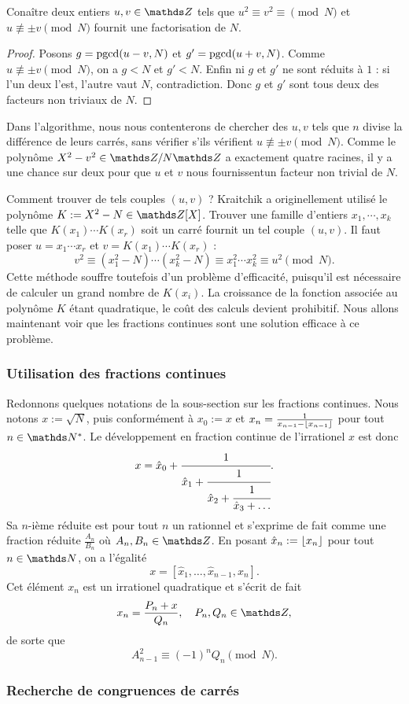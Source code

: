 \begin{lemme}
	Conaître deux entiers $u, v \in \Z$ tels que $u^2 \equiv v^2 \equiv
	\pmod{N}$ et $u\not\equiv \pm v\pmod{N}$ fournit une factorisation de $N$.
\end{lemme}

\begin{proof}
	Posons $g =\operatorname{pgcd}(u-v, N)$ et $g' = \operatorname{pgcd}(u+v, N)$. Comme $u\not\equiv \pm
	v\pmod{N}$, on a $g<N$ et $g'<N$. Enfin ni $g$ et $g'$ ne sont réduits à
	$1$ : si l'un deux l'est, l'autre vaut $N$, contradiction. Donc $g$ et $g'$
	sont tous deux des facteurs non triviaux de $N$.
\end{proof}

\begin{remarque}
	Dans l'algorithme, nous nous contenterons de chercher des $u, v$ tels que
	$n$ divise la différence de leurs carrés, sans vérifier s'ils vérifient $u
	\not\equiv \pm v\pmod{N}$. Comme le polynôme $X^2 - v^2 \in \Z/N\Z$ a
	exactement quatre racines, il y a \og{} une chance sur deux \fg pour que
	$u$ et $v$ nous fournissentun facteur non trivial de $N$. \\
\end{remarque}

Comment trouver de tels couples $(u, v)$ ? Kraitchik a originellement utilisé
le polynôme $K := X^2 - N \in \Z[X]$. Trouver une famille d'entiers $x_1,
\cdots, x_k$ telle que $K(x_1)\cdots K(x_r)$ soit un carré fournit un tel
couple $(u, v)$. Il faut poser $u = x_1\cdots x_r$ et $v = K(x_1)\cdots K(x_r)$
: \[v^2 \equiv (x_1^2 - N)\cdots (x_k^2 - N) \equiv x_1^2 \cdots x_k^2 \equiv
u^2\pmod{N}.\] Cette méthode souffre toutefois d'un problème d'efficacité,
puisqu'il est nécessaire de calculer un grand nombre de $K(x_i)$. La croissance
de la fonction associée au polynôme $K$ étant quadratique, le coût des calculs
devient prohibitif. Nous allons maintenant voir que les fractions continues
sont une solution efficace à ce problème. \\

\subsubsection{Utilisation des fractions continues}

Redonnons quelques notations de la sous-section  sur les fractions
continues. Nous notons $x := \sqrt{N}$, puis conformément à  $x_0 :=
x$ et $x_n = \frac{1}{x_{n-1}- \lfloor x_{n-1}\rfloor}$ pour tout $n\in \N^*$. Le
développement en fraction continue de l'irrationel $x$ est donc \[x = \hat{x}_0
+ \cfrac{1}{\hat{x}_1 + \cfrac{1}{\hat{x}_2 + \cfrac{1}{\hat{x}_3 + \dots}}}.\]
Sa $n$-ième réduite est pour tout $n$ un rationnel et s'exprime de fait comme
une fraction réduite $\frac{A_n}{B_n}$ où $A_n, B_n\in \Z$.  En posant
$\hat{x}_n := \lfloor x_n\rfloor$ pour tout $n\in \N$, on a l'égalité  \[x =
[\hat{x}_1, \dots, \hat{x}_{n-1}, x_n].\] Cet élément $x_n$ est un irrationel
quadratique et s'écrit de fait  \[x_n = \frac{P_n + x}{Q_n},\quad P_n,
Q_n\in \Z,\] de sorte que \[A_{n-1}^2 \equiv (-1)^n Q_n \pmod{N}.\]

\subsubsection{Recherche de congruences de carrés}
